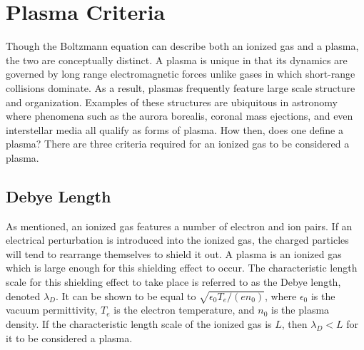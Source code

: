 \section{Plasma Criteria}
Though the Boltzmann equation can describe both an ionized gas and a plasma, the
two are conceptually distinct. A plasma is unique in that its dynamics are
governed by long range electromagnetic forces unlike gases in which short-range
collisions dominate. As a result, plasmas frequently feature large scale
structure and organization. Examples of these structures are ubiquitous in
astronomy where phenomena such as the aurora borealis, coronal mass ejections,
and even interstellar media all qualify as forms of plasma. How then, does one
define a plasma? There are three criteria required for an ionized gas to be
considered a plasma.

\subsection{Debye Length}
As mentioned, an ionized gas features a number of electron and ion pairs. If an
electrical perturbation is introduced into the ionized gas, the charged
particles will tend to rearrange themselves to shield it out. A plasma is an
ionized gas which is large enough for this shielding effect to occur. The
characteristic length scale for this shielding effect to take place is referred
to as the Debye length, denoted $\lambda_D$. It can be shown to be equal to
$\sqrt{\epsilon_0T_e/(en_0)}$, where $\epsilon_0$ is the vacuum permittivity,
$T_e$ is the electron temperature, and $n_0$ is the plasma density. If the
characteristic length scale of the ionized gas is $L$, then $\lambda_D < L$ for
it to be considered a plasma.

